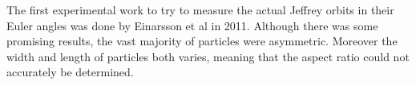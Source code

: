 The first experimental work to try to measure the actual Jeffrey orbits in their Euler angles was done by Einarsson et al \cite{JonasExperiment} in 2011. Although there was some promising results, the vast majority of particles were asymmetric. Moreover the width and length of particles both varies, meaning that the aspect ratio could not accurately be determined. 

